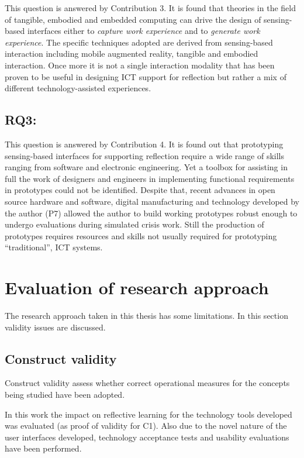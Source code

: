 This question is answered by Contribution 3. It is found that theories in the field of tangible, embodied and embedded computing can drive the design of sensing-based interfaces either to \emph{capture work experience} and to \emph{generate work experience}. The specific techniques adopted are derived from sensing-based interaction including mobile augmented reality, tangible and embodied interaction. Once more it is not a single interaction modality that has been proven to be useful in designing ICT support for reflection but rather a mix of different technology-assisted experiences.

\subsection{RQ3: \RQiii}\label{rq3}

This question is answered by Contribution 4. It is found out that prototyping sensing-based interfaces for supporting reflection require a wide range of skills ranging from software and electronic engineering. Yet a toolbox for assisting in full the work of designers and engineers in implementing functional requirements in prototypes could not be identified. Despite that, recent advances in open source hardware and software, digital manufacturing and technology developed by the author (P7) allowed the author to build working prototypes robust enough to undergo evaluations during simulated crisis work. Still the production of prototypes requires resources and skills not usually required for prototyping ``traditional'', ICT systems.

\section{Evaluation of research approach}\label{evaluation-of-research-approach}

The research approach taken in this thesis has some limitations. In this section validity issues \autocite{yin2013case} are discussed.

\subsection{Construct validity}\label{construct-validity}

Construct validity assess whether correct operational measures for the concepts being studied have been adopted.

In this work the impact on reflective learning for the technology tools developed was evaluated (as proof of validity for C1). Also due to the novel nature of the user interfaces developed, technology acceptance tests and usability evaluations have been performed.

